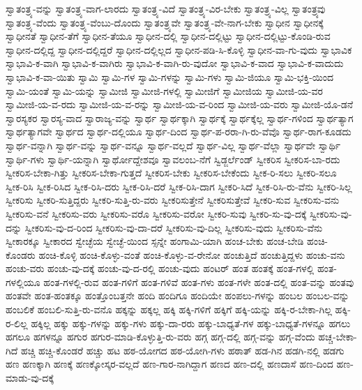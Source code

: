 {ಸ್ವಾತಂತ್ರ್ಯ-ವನ್ನು
ಸ್ವಾತಂತ್ರ್ಯ-ವಾಗ-ಲಾರದು
ಸ್ವಾತಂತ್ರ್ಯ-ವಿದೆ
ಸ್ವಾತಂತ್ರ್ಯ-ವಿರ-ಬೇಕು
ಸ್ವಾತಂತ್ರ್ಯ-ವಿಲ್ಲ
ಸ್ವಾತಂತ್ರ್ಯವು
ಸ್ವಾತಂತ್ರ್ಯ-ವೆಂದು
ಸ್ವಾತಂತ್ರ್ಯ-ವೆಂಬು-ದೊಂದು
ಸ್ವಾತಂತ್ರ್ಯವೇ
ಸ್ವಾತಂತ್ರ್ಯ-ವೇ-ನಾಗ-ಬೇಕು
ಸ್ವಾಧೀನ
ಸ್ವಾಧೀನಕ್ಕೆ
ಸ್ವಾಧೀನತೆ
ಸ್ವಾಧೀನ-ತೆಗೆ
ಸ್ವಾಧೀನ-ತೆಯೂ
ಸ್ವಾಧೀನ-ದಲ್ಲಿ
ಸ್ವಾಧೀನ-ದಲ್ಲಿಟ್ಟು
ಸ್ವಾಧೀನ-ದಲ್ಲಿಟ್ಟು-ಕೊಂಡಿ-ರುವ
ಸ್ವಾಧೀನ-ದಲ್ಲಿದ್ದ
ಸ್ವಾಧೀನ-ದಲ್ಲಿದ್ದರೆ
ಸ್ವಾಧೀನ-ದಲ್ಲಿಲ್ಲದ
ಸ್ವಾಧೀನ-ಪಡಿ-ಸಿ-ಕೊಳ್ಳಿ
ಸ್ವಾಧೀನ-ವಾ-ಗು-ವುದು
ಸ್ವಾಭಾವಿಕ
ಸ್ವಾಭಾವಿ-ಕ-ವಾಗಿ
ಸ್ವಾಭಾವಿ-ಕ-ವಾಗಿರು
ಸ್ವಾಭಾವಿ-ಕ-ವಾಗಿ-ರು-ವುದೋ
ಸ್ವಾಭಾವಿ-ಕ-ವಾದ
ಸ್ವಾಭಾವಿ-ಕ-ವಾದುದು
ಸ್ವಾಭಾವಿ-ಕ-ವಾ-ಯಿತು
ಸ್ವಾಮಿ
ಸ್ವಾಮಿ-ಗಳ
ಸ್ವಾಮಿ-ಗಳನ್ನು
ಸ್ವಾಮಿ-ಗಳು
ಸ್ವಾಮಿ-ಜಿಯೂ
ಸ್ವಾಮಿ-ಭಕ್ತಿ-ಯಿಂದ
ಸ್ವಾಮಿ-ಯಂತೆ
ಸ್ವಾಮಿ-ಯನ್ನು
ಸ್ವಾಮೀಜಿ
ಸ್ವಾಮೀಜಿ-ಗಳಲ್ಲಿ
ಸ್ವಾಮೀಜಿಗೆ
ಸ್ವಾಮೀಜಿಯ
ಸ್ವಾಮೀಜಿ-ಯ-ವರ
ಸ್ವಾಮೀಜಿ-ಯ-ವ-ರದು
ಸ್ವಾಮೀಜಿ-ಯ-ವ-ರನ್ನು
ಸ್ವಾಮೀಜಿ-ಯ-ವ-ರಿಂದ
ಸ್ವಾಮೀಜಿ-ಯ-ವರು
ಸ್ವಾಮೀಜಿ-ಯೊ-ಡನೆ
ಸ್ವಾರಸ್ಯಕರ
ಸ್ವಾರಸ್ಯ-ವಾದ
ಸ್ವಾರಾಜ್ಯ-ವನ್ನು
ಸ್ವಾರ್ಥ
ಸ್ವಾರ್ಥಕ್ಕಾಗಿ
ಸ್ವಾರ್ಥಕ್ಕೆ
ಸ್ವಾರ್ಥಕ್ಕೆಲ್ಲ
ಸ್ವಾರ್ಥ-ಗಳಿಂದ
ಸ್ವಾರ್ಥತ್ಯಾಗ
ಸ್ವಾರ್ಥತ್ಯಾಗವೇ
ಸ್ವಾರ್ಥದ
ಸ್ವಾರ್ಥ-ದಲ್ಲಿಯೂ
ಸ್ವಾರ್ಥ-ದಿಂದ
ಸ್ವಾರ್ಥ-ಪ-ರರಾ-ಗಿ-ರು-ವೆವೊ
ಸ್ವಾರ್ಥ-ರಾಗ-ಕೂಡದು
ಸ್ವಾರ್ಥ-ವನ್ನಾಗಿ
ಸ್ವಾರ್ಥ-ವನ್ನು
ಸ್ವಾರ್ಥ-ವನ್ನೂ
ಸ್ವಾರ್ಥ-ವಲ್ಲದೆ
ಸ್ವಾರ್ಥ-ವಿಲ್ಲ
ಸ್ವಾರ್ಥ-ವೆಲ್ಲಾ
ಸ್ವಾರ್ಥವೇ
ಸ್ವಾರ್ಥಿ
ಸ್ವಾರ್ಥಿ-ಗಳು
ಸ್ವಾರ್ಥಿ-ಯನ್ನಾಗಿ
ಸ್ವಾರ್ಥೋದ್ದೇಶವೂ
ಸ್ವಾವಲಂಬ-ನೆಗೆ
ಸ್ವಿಡ್ಜರ್ಲೆಂಡ್
ಸ್ವೀಕರಿಸ
ಸ್ವೀಕರಿಸ-ಬಾ-ರದು
ಸ್ವೀಕರಿಸ-ಬೇಕಾ-ಗಿತ್ತು
ಸ್ವೀಕರಿಸ-ಬೇಕಾ-ಗುತ್ತದೆ
ಸ್ವೀಕರಿಸ-ಬೇಕು
ಸ್ವೀಕರಿಸ-ಬೇಕೆಂದು
ಸ್ವೀಕ-ರಿ-ಸಲು
ಸ್ವೀಕರಿ-ಸಲೂ
ಸ್ವೀಕ-ರಿಸಿ
ಸ್ವೀಕ-ರಿಸಿದ
ಸ್ವೀಕ-ರಿಸಿ-ದರು
ಸ್ವೀಕ-ರಿಸಿ-ದರೆ
ಸ್ವೀಕ-ರಿಸಿ-ದಾಗ
ಸ್ವೀಕರಿ-ಸಿದೆ
ಸ್ವೀಕ-ರಿಸಿ-ರು-ವೆನು
ಸ್ವೀಕರಿ-ಸಿಲ್ಲ
ಸ್ವೀಕರಿಸು
ಸ್ವೀಕರಿ-ಸುತ್ತಿದ್ದರು
ಸ್ವೀಕರಿ-ಸುತ್ತಿ-ರು-ವರು
ಸ್ವೀಕರಿಸುತ್ತೇನೆ
ಸ್ವೀಕರಿಸುತ್ತೇವೆ
ಸ್ವೀಕರಿ-ಸುವ
ಸ್ವೀಕರಿಸು-ವನು
ಸ್ವೀಕರಿಸು-ವನೆ
ಸ್ವೀಕರಿಸು-ವರು
ಸ್ವೀಕರಿಸು-ವರೊ
ಸ್ವೀಕರಿಸು-ವರೋ
ಸ್ವೀಕರಿ-ಸುವು
ಸ್ವೀಕರಿ-ಸು-ವು-ದಕ್ಕೆ
ಸ್ವೀಕರಿಸು-ವು-ದನ್ನು
ಸ್ವೀಕರಿಸು-ವು-ದ-ರಿಂದ
ಸ್ವೀಕರಿಸು-ವು-ದಾ-ದರೆ
ಸ್ವೀಕರಿಸು-ವು-ದಿಲ್ಲ
ಸ್ವೀಕರಿಸು-ವುದು
ಸ್ವೀಕರಿಸು-ವೆನು
ಸ್ವೀಕಾರಕ್ಕೂ
ಸ್ವೀಕಾರದ
ಸ್ವೇಚ್ಛೆಯ
ಸ್ವೇಚ್ಛೆ-ಯಿಂದ
ಸ್ಸನ್ನೇ
ಹಂಗಾಮಿ-ಯಾಗಿ
ಹಂಚ-ಬೇಕು
ಹಂಚ-ಬೇಡಿ
ಹಂಚಿ-ಕೊಂಡರು
ಹಂಚಿ-ಕೊಳ್ಳಿ
ಹಂಚಿ-ಕೊಳ್ಳು-ವಂತೆ
ಹಂಚಿ-ಕೊಳ್ಳು-ವ-ರೇನೋ
ಹಂಚುತ್ತಿದೆ
ಹಂಚುತ್ತಿದ್ದಳು
ಹಂಚು-ವನು
ಹಂಚು-ವರು
ಹಂಚು-ವು-ದಕ್ಕೆ
ಹಂಚು-ವು-ದ-ರಲ್ಲಿ
ಹಂಚು-ವುದು
ಹಂಟರ್
ಹಂತ
ಹಂತಕ್ಕೆ
ಹಂತ-ಗಳಲ್ಲಿ
ಹಂತ-ಗಳಲ್ಲಿಯೂ
ಹಂತ-ಗಳಲ್ಲಿ-ರುವ
ಹಂತ-ಗಳಿಗೆ
ಹಂತ-ಗಳಿವೆ
ಹಂತ-ಗಳು
ಹಂತ-ಗಳೇ
ಹಂತ-ದಲ್ಲಿ
ಹಂತ-ವನ್ನು
ಹಂತವು
ಹಂತವೇ
ಹಂತ-ಹಂತಕ್ಕೂ
ಹಂತ್ತೊಂಬತ್ತನೇ
ಹಂದಿ
ಹಂದಿಗೂ
ಹಂದಿಯೇ
ಹಂಪಲು-ಗಳನ್ನು
ಹಂಬಲ
ಹಂಬಲ-ವನ್ನು
ಹಂಬಲಿಕೆ
ಹಂಬಲಿ-ಸುತ್ತಿ-ರು-ವನೊ
ಹಕ್ಕನ್ನು
ಹಕ್ಕಲ್ಲ
ಹಕ್ಕಿ
ಹಕ್ಕಿ-ಗಳಿಗೆ
ಹಕ್ಕಿಗೆ
ಹಕ್ಕಿ-ಯನ್ನು
ಹಕ್ಕಿ-ರ-ಬೇಕಾ-ಗಿಲ್ಲ
ಹಕ್ಕಿ-ರ-ಲಿಲ್ಲ
ಹಕ್ಕಿಲ್ಲ
ಹಕ್ಕು
ಹಕ್ಕು-ಗಳನ್ನು
ಹಕ್ಕು-ಗಳು
ಹಕ್ಕು-ದಾ-ರರು
ಹಕ್ಕು-ಬಾಧ್ಯತೆ-ಗಳ
ಹಕ್ಕು-ಬಾಧ್ಯತೆ-ಗಳನ್ನೂ
ಹಗಲು
ಹಗಲೂ
ಹಗಳನ್ನೂ
ಹಗುರ
ಹಗುರ-ಮಾಡಿ-ಕೊಳ್ಳುತ್ತಿ-ರು-ವರು
ಹಗ್ಗ
ಹಗ್ಗ-ದಲ್ಲಿ
ಹಗ್ಗ-ವನ್ನು
ಹಗ್ಗ-ವೆಂದು
ಹಚ್ಚ-ಬೇಕಾ-ಗಿದೆ
ಹಚ್ಚಿ
ಹಚ್ಚಿ-ಕೊಂಡರೆ
ಹಚ್ಚು
ಹಟ
ಹಠ-ಯೋಗದ
ಹಠ-ಯೋಗಿ-ಗಳು
ಹಠಾತ್
ಹಡ-ಗಿನ
ಹಡಗಿ-ನಲ್ಲಿ
ಹಡಗು
ಹಣ
ಹಣಕ್ಕಾಗಿ
ಹಣಕ್ಕೆ
ಹಣಕ್ಕೋಸ್ಕರ-ವಲ್ಲದೆ
ಹಣ-ಗಾರ-ನಾಗಿದ್ದಾಗ
ಹಣದ
ಹಣ-ದಲ್ಲಿ
ಹಣದಾಸೆ
ಹಣ-ದಿಂದ
ಹಣ-ಮಾಡು-ವು-ದಕ್ಕೆ
}

